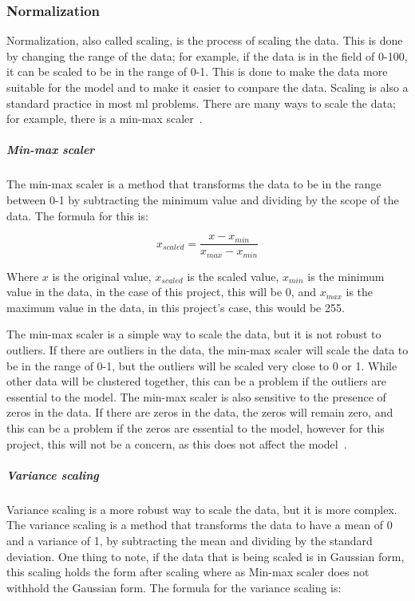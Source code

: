 \subsubsection{Normalization}\label{sec:normalization}
Normalization, also called scaling, is the process of scaling the data. This is done by changing the range of the data; for example, if the data is in the field of 0-100, it can be scaled to be in the range of 0-1. This is done to make the data more suitable for the model and to make it easier to compare the data. Scaling is also a standard practice in most \gls{ml} problems. There are many ways to scale the data; for example, there is a min-max scaler~\cite{Feature-engineering-zheng}.

  
\subparagraph{Min-max scaler}\label{subsec:min-max}
The min-max scaler is a method that transforms the data to be in the range between 0-1 by subtracting the minimum value and dividing by the scope of the data. The formula for this is:

\begin{equation}
    x_{scaled} = \frac{x - x_{min}}{x_{max} - x_{min}}
\end{equation}

Where $x$ is the original value, $x_{scaled}$ is the scaled value, $x_{min}$ is the minimum value in the data, in the case of this project, this will be 0, and $x_{max}$ is the maximum value in the data, in this project's case, this would be 255.

The min-max scaler is a simple way to scale the data, but it is not robust to outliers. If there are outliers in the data, the min-max scaler will scale the data to be in the range of 0-1, but the outliers will be scaled very close to 0 or 1. While other data will be clustered together, this can be a problem if the outliers are essential to the model. The min-max scaler is also sensitive to the presence of zeros in the data. If there are zeros in the data, the zeros will remain zero, and this can be a problem if the zeros are essential to the model, however for this project, this will not be a concern, as this does not affect the model~\cite{Feature-engineering-zheng}.

\subparagraph{Variance scaling}\label{sec:variance-scaling}
Variance scaling is a more robust way to scale the data, but it is more complex. The variance scaling is a method that transforms the data to have a mean of 0 and a variance of 1, by subtracting the mean and dividing by the standard deviation. One thing to note, if the data that is being scaled is in Gaussian form, this scaling holds the form after scaling where as Min-max scaler does not withhold the Gaussian form. The formula for the variance scaling is:

